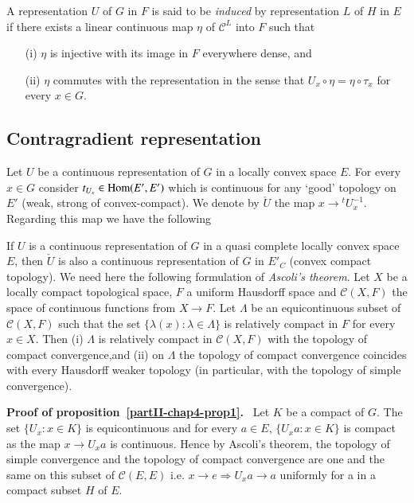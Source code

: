 \begin{defi*}%
 A representation $U$ of $G$ in $F$ is said to be {\em induced} by
 representation $L$ of $H$ in $E$ if there exists a linear continuous
 map $\eta$ of $\mathscr{C}^L$ into $F$ such that 
\begin{itemize}
\item[(i)] $\eta$ is injective with its image in $F$ everywhere dense,
 and  

\item[(ii)] $\eta$ commutes with the representation in the sense that
$U_x \circ \eta= \eta \circ \tau_x$ for every $x\in G$. 
\end{itemize}
\end{defi*}

\subsection{Contragradient representation}\label{partII-chap4-sec4.3}

Let $U$ be a continuous representation of $G$ in a locally convex
space $E$. For every $x \in G$ consider $t_{U_{x}}\in \operatorname{Hom}(E',
E')$ which is continuous for any `good' topology on $E'$ (weak, strong
of convex-compact). We denote by $\check{U}$ the map $x\rightarrow
{}^t U_{x}^{-1}$. Regarding this map we have the following 

\setcounter{proposition}{0} 
\begin{proposition}\label{partII-chap4-prop1}%
 If $U$ is a continuous representation of $G$ in a quasi complete
 locally convex space $E$, then $\check{U}$ is also a continuous
 representation of $G$ in $E'_C$ (convex compact topology). We need
 here the following formulation of {\em Ascoli's theorem}. Let $X$ be
 a locally compact topological space, $F$ a uniform Hausdorff space
 and $\mathscr{C}(X,F)$ the space of continuous functions from $X
 \rightarrow F$. Let $\Lambda$ be an equicontinuous subset of
 $\mathscr{C} (X,F)$ such that the set $\{ \lambda(x) : \lambda \in
 \Lambda \}$ is relatively compact in $F$ for every $x \in X$. Then
 (i) $\Lambda$ is relatively compact in $\mathscr{C} (X,F)$ with the
 topology of compact convergence,\pageoriginale and (ii) on $\Lambda$
 the topology 
  of compact convergence coincides with every Hausdorff weaker topology
 (in particular, with the topology of simple convergence). 
\end{proposition}

\medskip
\noindent
{\bf Proof of proposition~\ref{partII-chap4-prop1}.}~
Let $K$ be a compact of $G$. The set $\{ U_x : x\in K \}$ is
equicontinuous and for every $a\in E$, $\{U_xa : x\in K \}$ is compact
as the map $x \rightarrow U_xa$  is continuous. Hence by Ascoli's
theorem, the topology of simple convergence and the topology  of
compact convergence are one and the same on this subset of
$\mathscr{C} (E,E)$ i.e. $x\rightarrow e\Rightarrow U_xa
\rightarrow a$ uniformly for a in a compact subset $H$ of $E$. 

